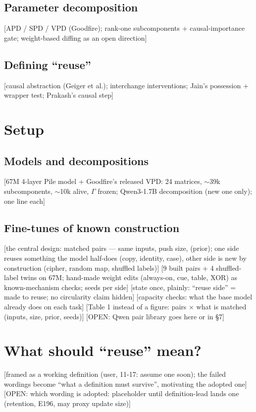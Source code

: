 \documentclass[11pt]{article}
\newcommand{\sugg}[1]{\textcolor{blue!60!black}{[#1]}}
\newcommand{\open}[1]{\textcolor{red!70!black}{[OPEN: #1]}}
\begin{document}
\subsection{Parameter decomposition}
\sugg{APD / SPD / VPD (Goodfire); rank-one subcomponents + causal-importance gate; weight-based diffing as an open
direction}
\subsection{Defining ``reuse''}
\sugg{causal abstraction (Geiger et al.); interchange interventions; Jain's possession + wrapper test; Prakash's
causal step}

\section{Setup}
\subsection{Models and decompositions}
\sugg{67M 4-layer Pile model + Goodfire's released VPD: 24 matrices, $\sim$39k subcomponents, $\sim$10k alive,
$\Gamma$ frozen; Qwen3-1.7B decomposition (new one only); one line each}
\subsection{Fine-tunes of known construction}
\sugg{the central design: matched pairs --- same inputs, push size, (prior); one side reuses something the model
half-does (copy, identity, case), other side is new by construction (cipher, random map, shuffled labels)}
\sugg{9 built pairs + 4 shuffled-label twins on 67M; hand-made weight edits (always-on, cue, table, XOR) as
known-mechanism checks; seeds per side}
\sugg{state once, plainly: ``reuse side'' = made to reuse; no circularity claim hidden}
\sugg{capacity checks: what the base model already does on each task}
\sugg{Table 1 instead of a figure: pairs $\times$ what is matched (inputs, size, prior, seeds)}
\open{Qwen pair library goes here or in \S7}

\section{What should ``reuse'' mean?}
\sugg{framed as a working definition (user, 11-17: assume one soon); the failed wordings become ``what a definition
must survive'', motivating the adopted one}
\open{which wording is adopted: placeholder until definition-lead lands one (retention, E196, may proxy update size)}
\end{document}
